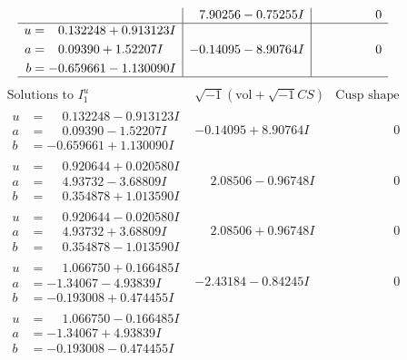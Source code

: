\documentclass[1p]{elsarticle_modified}
\theoremstyle{definition}
\newcommand{\I}{\sqrt{-1}}
\begin{document}
$$\begin{array}{c|c|c}
 & \phantom{-}7.90256 - 0.75255 I & \phantom{-0.000000 } 0 \\ \hline\begin{aligned}
u &= \phantom{-}0.132248 + 0.913123 I \\
a &= \phantom{-}0.09390 + 1.52207 I \\
b &= -0.659661 - 1.130090 I\end{aligned}
 & -0.14095 - 8.90764 I & \phantom{-0.000000 } 0\\
 \hline 
 \end{array}$$\newpage$$\begin{array}{c|c|c}  
\text{Solutions to }I^u_{1}& \I (\text{vol} + \sqrt{-1}CS) & \text{Cusp shape}\\
 \hline 
\begin{aligned}
u &= \phantom{-}0.132248 - 0.913123 I \\
a &= \phantom{-}0.09390 - 1.52207 I \\
b &= -0.659661 + 1.130090 I\end{aligned}
 & -0.14095 + 8.90764 I & \phantom{-0.000000 } 0 \\ \hline\begin{aligned}
u &= \phantom{-}0.920644 + 0.020580 I \\
a &= \phantom{-}4.93732 - 3.68809 I \\
b &= \phantom{-}0.354878 + 1.013590 I\end{aligned}
 & \phantom{-}2.08506 - 0.96748 I & \phantom{-0.000000 } 0 \\ \hline\begin{aligned}
u &= \phantom{-}0.920644 - 0.020580 I \\
a &= \phantom{-}4.93732 + 3.68809 I \\
b &= \phantom{-}0.354878 - 1.013590 I\end{aligned}
 & \phantom{-}2.08506 + 0.96748 I & \phantom{-0.000000 } 0 \\ \hline\begin{aligned}
u &= \phantom{-}1.066750 + 0.166485 I \\
a &= -1.34067 - 4.93839 I \\
b &= -0.193008 + 0.474455 I\end{aligned}
 & -2.43184 - 0.84245 I & \phantom{-0.000000 } 0 \\ \hline\begin{aligned}
u &= \phantom{-}1.066750 - 0.166485 I \\
a &= -1.34067 + 4.93839 I \\
b &= -0.193008 - 0.474455 I\end{aligned}

\end{array}$$
\end{document}
